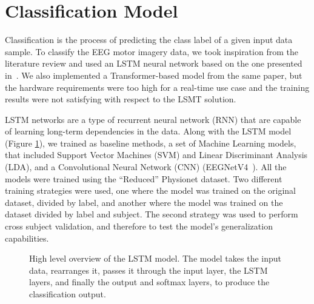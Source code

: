 \section{Classification Model}
Classification is the process of predicting the class label of a given input data sample.
To classify the EEG motor imagery data, we took inspiration from the literature review and used an LSTM neural network based on the one presented in~\cite{sharma_deep_2023}.
We also implemented a Transformer-based model from the same paper, but the hardware requirements were too high for a real-time use case and the training results were not satisfying with respect to the LSMT solution.

LSTM networks are a type of recurrent neural network (RNN) that are capable of learning long-term dependencies in the data.
Along with the LSTM model (Figure \ref{fig:lstm}), we trained as baseline methods, a set of Machine Learning models, that included Support Vector Machines (SVM) and Linear Discriminant Analysis (LDA), and a Convolutional Neural Network (CNN) (EEGNetV4~\cite{lawhern2018eegnet}).
All the models were trained using the ``Reduced'' Physionet dataset. 
Two different training strategies were used, one where the model was trained on the original dataset, divided by label, and another where the model was trained on the dataset divided by label and subject.
The second strategy was used to perform cross subject validation, and therefore to test the model's generalization capabilities.

\begin{figure}[!htbp]
    \centering
    \caption{High level overview of the LSTM model.
    The model takes the input data, rearranges it, passes it through the input layer, the LSTM layers, and finally the output and softmax layers, to produce the classification output.}\label{fig:lstm}
\end{figure}

